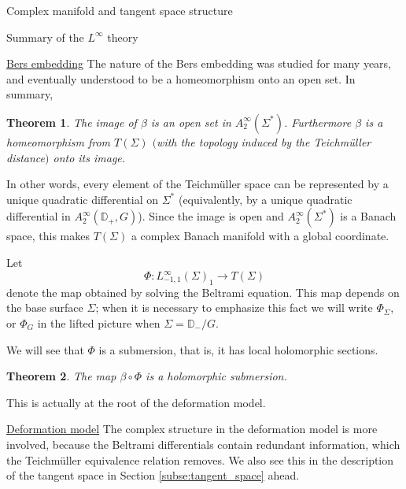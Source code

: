 \documentclass[12pt]{amsart}
\newcommand{\disk}{\ensuremath{\mathbb{D}} } %
\newcommand{\riem}{\Sigma}  %
\theoremstyle{plain}
\newtheorem{theorem}{Theorem}[section]
\theoremstyle{definition}
\theoremstyle{remark}
\numberwithin{equation}{section} %
\numberwithin{figure}{section} %
\begin{document}
\begin{section}{Complex manifold and tangent space structure} 
\label{se:classical_complex_structure}
\begin{subsection}{Summary of the $L^\infty$ theory}
\begin{subsubsection}{\underline{Bers embedding}}
 \label{subsubse:Bers_embedding_complex}
 The nature of the Bers embedding was studied for many years, and eventually understood to be a homeomorphism onto an open set. In summary,
 \begin{theorem} The image of $\beta$ is an open set in $A_2^\infty(\riem^*)$. Furthermore $\beta$ is a homeomorphism from $T(\riem)$ $($with the topology induced by the Teichm\"uller distance$)$ onto its image.  
 \end{theorem}

 In other words, every element of the Teichm\"uller space can be represented by a unique quadratic differential on $\riem^*$ (equivalently, by a unique quadratic differential in $A_2^\infty(\disk_+,G)$). Since the image is open and $A_2^\infty(\riem^*)$ is a Banach space, this makes $T(\riem)$ a complex Banach manifold with a global coordinate.

 Let 
 \[ \Phi:L^\infty_{-1,1}(\riem)_1 \rightarrow T(\riem) \] denote the map obtained by solving the Beltrami equation. This map depends on the base surface $\riem$; when it is necessary to emphasize this fact we will write $\Phi_\riem$, or $\Phi_G$ in the lifted picture when $\riem=\disk_-/G$.  

 We will see that $\Phi$ is a submersion, that is, it has local holomorphic sections. 
 \begin{theorem}
     The map $\beta \circ \Phi$ is a holomorphic submersion. 
 \end{theorem}
 This is actually at the root of the deformation model. 
  
\end{subsubsection}
\begin{subsubsection}{\underline{Deformation model}}  \label{subsubse:deformation_complex_structure}
 The complex structure in the deformation model is more involved, because the Beltrami differentials contain redundant information, which the Teichm\"uller equivalence relation removes. We also see this in the description of the tangent space in Section \ref{subse:tangent_space} ahead.
 

\end{subsubsection}
\end{subsection}
\end{section}
\end{document}
